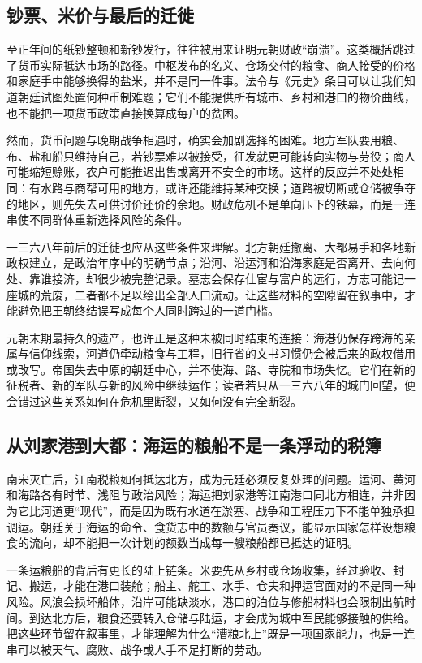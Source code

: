 \subsection{钞票、米价与最后的迁徙}

至正年间的纸钞整顿和新钞发行，往往被用来证明元朝财政“崩溃”。这类概括跳过了货币实际抵达市场的路径。中枢发布的名义、仓场交付的粮食、商人接受的价格和家庭手中能够换得的盐米，并不是同一件事。法令与《元史》条目可以让我们知道朝廷试图处置何种币制难题；它们不能提供所有城市、乡村和港口的物价曲线，也不能把一项货币政策直接换算成每户的贫困。

然而，货币问题与晚期战争相遇时，确实会加剧选择的困难。地方军队要用粮、布、盐和船只维持自己，若钞票难以被接受，征发就更可能转向实物与劳役；商人可能缩短赊账，农户可能推迟出售或离开不安全的市场。这样的反应并不处处相同：有水路与商帮可用的地方，或许还能维持某种交换；道路被切断或仓储被争夺的地区，则先失去可供讨价还价的余地。财政危机不是单向压下的铁幕，而是一连串使不同群体重新选择风险的条件。

一三六八年前后的迁徙也应从这些条件来理解。北方朝廷撤离、大都易手和各地新政权建立，是政治年序中的明确节点；沿河、沿运河和沿海家庭是否离开、去向何处、靠谁接济，却很少被完整记录。墓志会保存仕宦与富户的远行，方志可能记一座城的荒废，二者都不足以绘出全部人口流动。让这些材料的空隙留在叙事中，才能避免把王朝终结误写成每个人同时跨过的一道门槛。

元朝末期最持久的遗产，也许正是这种未被同时结束的连接：海港仍保存跨海的亲属与信仰线索，河道仍牵动粮食与工程，旧行省的文书习惯仍会被后来的政权借用或改写。帝国失去中原的朝廷中心，并不使海、路、寺院和市场失忆。它们在新的征税者、新的军队与新的风险中继续运作；读者若只从一三六八年的城门回望，便会错过这些关系如何在危机里断裂，又如何没有完全断裂。

\subsection{从刘家港到大都：海运的粮船不是一条浮动的税簿}

南宋灭亡后，江南税粮如何抵达北方，成为元廷必须反复处理的问题。运河、黄河和海路各有时节、浅阻与政治风险；海运把刘家港等江南港口同北方相连，并非因为它比河道更“现代”，而是因为既有水道在淤塞、战争和工程压力下不能单独承担调运。朝廷关于海运的命令、食货志中的数额与官员奏议，能显示国家怎样设想粮食的流向，却不能把一次计划的额数当成每一艘粮船都已抵达的证明。

一条运粮船的背后有更长的陆上链条。米要先从乡村或仓场收集，经过验收、封记、搬运，才能在港口装舱；船主、舵工、水手、仓夫和押运官面对的不是同一种风险。风浪会损坏船体，沿岸可能缺淡水，港口的泊位与修船材料也会限制出航时间。到达北方后，粮食还要转入仓储与陆运，才会成为城中军民能够接触的供给。把这些环节留在叙事里，才能理解为什么“漕粮北上”既是一项国家能力，也是一连串可以被天气、腐败、战争或人手不足打断的劳动。

